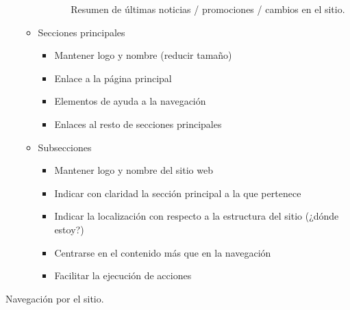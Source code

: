 \documentclass[12pt, twoside, openright]{report} %
\begin{document}
\begin{itemize}
\begin{itemize}
\begin{itemize}
\begin{itemize}
				                        Resumen de últimas noticias / promociones / cambios en
				                        el sitio.
			                  \end{itemize}
		            \end{itemize}

		      \item Secciones principales
		            \begin{itemize}
			            \item Mantener logo y nombre (reducir tamaño)

			            \item Enlace a la página principal

			            \item Elementos de ayuda a la navegación

			            \item Enlaces al resto de secciones principales
		            \end{itemize}

		      \item Subsecciones
		            \begin{itemize}
			            \item Mantener logo y nombre del sitio web

			            \item Indicar con claridad la sección principal a la que pertenece

			            \item Indicar la localización con respecto a la estructura del
			                  sitio (¿dónde estoy?)

			            \item Centrarse en el contenido más que en la navegación

			            \item Facilitar la ejecución de acciones
		            \end{itemize}
	      \end{itemize}
\end{itemize}


Navegación por el sitio.
\end{document}
